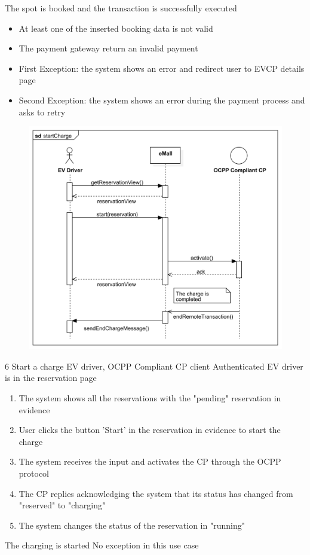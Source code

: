 {The spot is booked and the transaction is successfully executed}
{
    \begin{itemize}
        \item At least one of the inserted booking data is not valid
        \item The payment gateway return an invalid payment
    \end{itemize}
}
{
    \begin{itemize}
        \item First Exception: the system shows an error and redirect user to EVCP details page
        \item Second Exception: the system shows an error during the payment process and asks to retry
    \end{itemize}
}

\usecase
{
    \begin{figure}[H]
        \centering
        \includegraphics[scale=0.9]{src/sequence_diagram/startCharge.png}
    \end{figure}
}
{6}
{Start a charge}
{EV driver, OCPP Compliant CP client}
{Authenticated EV driver is in the reservation page}
{
    \begin{enumerate}
        \item The system shows all the reservations with the "pending" reservation in evidence
        \item User clicks the button 'Start' in the reservation in evidence to start the charge
        \item The system receives the input and activates the CP through the OCPP protocol
        \item The CP replies acknowledging the system that its status has changed from "reserved" to "charging"
        \item The system changes the status of the reservation in "running"
    \end{enumerate}
}
{The charging is started}
{
    No exception in this use case
}
{
}

